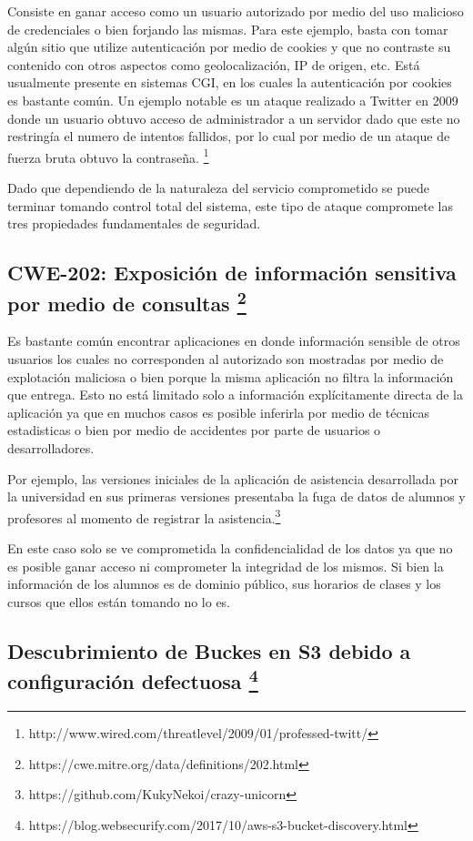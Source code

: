 \documentclass[11pt]{utalcaDoc}
\begin{document}
Consiste en ganar acceso como un usuario autorizado por medio del uso malicioso de credenciales o bien forjando las mismas. Para este ejemplo, basta con tomar algún sitio que utilize autenticación por medio de cookies y que no contraste su contenido con otros aspectos como geolocalización, IP de origen, etc. Está usualmente presente en sistemas CGI, en los cuales la autenticación por cookies es bastante común. Un ejemplo notable es un ataque realizado a Twitter en 2009 donde un usuario obtuvo acceso de administrador a un servidor dado que este no restringía el numero de intentos fallidos, por lo cual por medio de un ataque de fuerza bruta obtuvo la contraseña. \footnote{http://www.wired.com/threatlevel/2009/01/professed-twitt/}

Dado que dependiendo de la naturaleza del servicio comprometido se puede terminar tomando control total del sistema, este tipo de ataque compromete las tres propiedades fundamentales de seguridad.

\subsection{
    CWE-202: Exposición de información sensitiva por medio de consultas
    \footnote{ https://cwe.mitre.org/data/definitions/202.html }
}

Es bastante común encontrar aplicaciones en donde información sensible de otros usuarios los cuales no corresponden al autorizado son mostradas por medio de explotación maliciosa o bien porque la misma aplicación no filtra la información que entrega. Esto no está limitado solo a información explícitamente directa de la aplicación ya que en muchos casos es posible inferirla por medio de técnicas estadisticas o bien por medio de accidentes por parte de usuarios o desarrolladores.

Por ejemplo, las versiones iniciales de la aplicación de asistencia desarrollada por la universidad en sus primeras versiones presentaba la fuga de datos de alumnos y profesores al momento de registrar la asistencia.\footnote{https://github.com/KukyNekoi/crazy-unicorn}

En este caso solo se ve comprometida la confidencialidad de los datos ya que no es posible ganar acceso ni comprometer la integridad de los mismos. Si bien la información de los alumnos es de dominio público, sus horarios de clases y los cursos que ellos están tomando no lo es.



\subsection{
    Descubrimiento de Buckes en S3 debido a configuración defectuosa
    \footnote{ https://blog.websecurify.com/2017/10/aws-s3-bucket-discovery.html }
}
\end{document}
